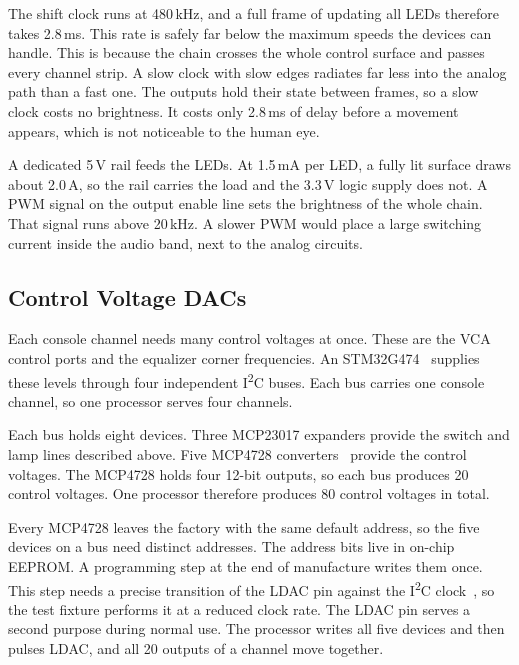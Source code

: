 \documentclass[11pt, letterpaper,titlepage]{article}
\begin{document}
 
The shift clock runs at 480\,kHz, and a full frame of updating all LEDs therefore takes 2.8\,ms. This
rate is safely far below the maximum speeds the devices can handle. This is because the
chain crosses the whole control surface and passes every channel strip. A slow
clock with slow edges radiates far less into the analog path than a fast one.
The outputs hold their state between frames, so a slow clock costs no
brightness. It costs only 2.8\,ms of delay before a movement appears, which is not noticeable to the human eye.
 
A dedicated 5\,V rail feeds the LEDs. At 1.5\,mA per LED, a fully lit surface
draws about 2.0\,A, so the rail carries the load and the 3.3\,V logic supply does
not. A PWM signal on the output enable line sets the brightness of the whole
chain. That signal runs above 20\,kHz. A slower PWM would place a large
switching current inside the audio band, next to the analog circuits.
 




\subsection{Control Voltage DACs}
\label{ssec:cv-dacs}

Each console channel needs many control voltages at once. These are the VCA control
ports and the equalizer corner frequencies. An STM32G474~\cite{stm32g474} supplies these levels
through four independent I\textsuperscript{2}C buses. Each bus carries one
console channel, so one processor serves four channels.

Each bus holds eight devices. Three MCP23017 expanders provide the switch and
lamp lines described above. Five MCP4728 converters~\cite{mcp4728} provide the control
voltages. The MCP4728 holds four 12-bit outputs, so each bus produces 20
control voltages. One processor therefore produces 80 control voltages in
total.

Every MCP4728 leaves the factory with the same default address, so the five
devices on a bus need distinct addresses. The address bits live in on-chip
EEPROM. A programming step at the end of manufacture writes them once. This
step needs a precise transition of the LDAC pin against the I\textsuperscript{2}C
clock~\cite{mcp4728}, so the test fixture performs it at a reduced clock rate. The LDAC pin
serves a second purpose during normal use. The processor writes all five
devices and then pulses LDAC, and all 20 outputs of a channel move together.
\end{document}
